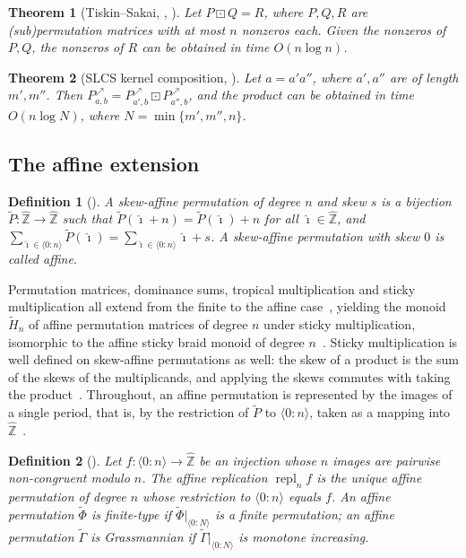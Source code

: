 \documentclass[10pt]{article}
\newtheorem{definition}{Definition}
\newtheorem{theorem}{Theorem}
\newcommand{\Zh}{\widehat{\mathbb{Z}}}
\newcommand{\stick}{\boxdot}
\newcommand{\repl}{\operatorname{repl}}
\begin{document}
\begin{theorem}[Tiskin--Sakai, {\cite{Tiskin15,Sakai11}},
{\cite[Theorem 14]{GZT25}}]\label{thm:tiskinsakai}
Let $P\stick Q=R$, where $P,Q,R$ are (sub)permutation matrices with at most
$n$ nonzeros each. Given the nonzeros of $P,Q$, the nonzeros of $R$ can be
obtained in time $O(n\log n)$.
\end{theorem}

\begin{theorem}[SLCS kernel composition, {\cite[Theorem 35]{GZT25}}]
Let $a=a'a''$, where $a',a''$ are of length $m',m''$. Then
$P^{\nearrow}_{a,b}=P^{\nearrow}_{a',b}\stick P^{\nearrow}_{a'',b}$, and the
product can be obtained in time $O(n\log N)$, where
$N=\min\{m',m'',n\}$.
\end{theorem}

\subsection{The affine extension}\label{sec:affine}

\begin{definition}[{\cite[Definition 20]{GZT25}}]\label{def:affineperm}
A \emph{skew-affine permutation} of degree $n$ and \emph{skew} $s$ is a
bijection $\tilde P:\Zh\to\Zh$ such that $\tilde P(\hat\imath+n)=
\tilde P(\hat\imath)+n$ for all $\hat\imath\in\Zh$, and
$\sum_{\hat\imath\in\langle 0:n\rangle}\tilde P(\hat\imath)
=\sum_{\hat\imath\in\langle 0:n\rangle}\hat\imath+s$. A skew-affine
permutation with skew $0$ is called \emph{affine}.
\end{definition}

Permutation matrices, dominance sums, tropical multiplication and sticky
multiplication all extend from the finite to the affine
case~\cite{Pflueger22}, yielding the monoid $\tilde H_n$ of affine
permutation matrices of degree $n$ under sticky multiplication, isomorphic to
the affine sticky braid monoid of degree
$n$~\cite[Definitions 22, 24, Theorem 25]{GZT25}. Sticky multiplication is
well defined on skew-affine permutations as well: the skew of a product is
the sum of the skews of the multiplicands, and applying the skews commutes
with taking the product~\cite[Remark 23]{GZT25}. Throughout, an affine
permutation is represented by the images of a single period, that is, by the
restriction of $\tilde P$ to $\langle 0:n\rangle$, taken as a mapping into
$\Zh$~\cite[Section 4.1]{GZT25}.

\begin{definition}[{\cite[Definitions 26, 28]{GZT25}}]\label{def:phigamma}
Let $f:\langle 0:n\rangle\to\Zh$ be an injection whose $n$ images are pairwise
non-congruent modulo $n$. The \emph{affine replication} $\repl_n f$ is the
unique affine permutation of degree $n$ whose restriction to
$\langle 0:n\rangle$ equals $f$. An affine permutation $\tilde\Phi$ is
\emph{finite-type} if $\tilde\Phi|_{\langle 0:N\rangle}$ is a finite
permutation; an affine permutation $\tilde\Gamma$ is \emph{Grassmannian} if
$\tilde\Gamma|_{\langle 0:N\rangle}$ is monotone increasing.
\end{definition}
\end{document}
